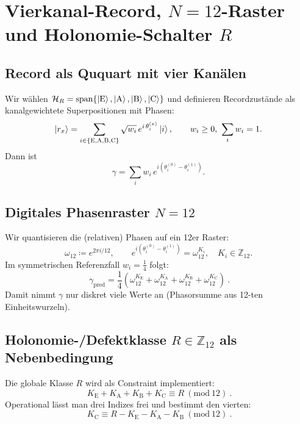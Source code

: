 \documentclass[11pt,a4paper]{article}
\newcommand{\Z}{\mathbb{Z}}
\newcommand{\modtwelve}{\ (\mathrm{mod}\ 12)}
\newcommand{\wT}{\omega_{12}}
\newcommand{\EE}{\mathrm{E}}
\newcommand{\AA}{\mathrm{A}}
\newcommand{\BB}{\mathrm{B}}
\newcommand{\CC}{\mathrm{C}}
\begin{document}
	\section{Vierkanal-Record, $N{=}12$-Raster und Holonomie-Schalter $R$}
	
	\subsection{Record als Ququart mit vier Kanälen}
	
	Wir wählen \(\mathcal{H}_R=\mathrm{span}\{\ket{\EE},\ket{\AA},\ket{\BB},\ket{\CC}\}\) und definieren
	Recordzustände als kanalgewichtete Superpositionen mit Phasen:
	\begin{equation}
		\ket{r_x}=\sum_{i\in\{\EE,\AA,\BB,\CC\}} \sqrt{w_i}\,e^{i\,\theta^{(x)}_i}\ket{i},
		\qquad w_i\ge 0,\ \sum_i w_i=1.
	\end{equation}
	Dann ist
	\begin{equation}
		\gamma=\sum_{i} w_i\,e^{i(\theta^{(0)}_i-\theta^{(1)}_i)}.
		\label{eq:gamma_general}
	\end{equation}
	
	\subsection{Digitales Phasenraster $N{=}12$}
	
	Wir quantisieren die (relativen) Phasen auf ein 12er Raster:
	\begin{equation}
		\wT \coloneqq e^{2\pi i/12},\qquad
		e^{i(\theta^{(0)}_i-\theta^{(1)}_i)}=\wT^{K_i},\quad K_i\in\Z_{12}.
	\end{equation}
	Im symmetrischen Referenzfall \(w_i=\tfrac14\) folgt:
	\begin{equation}
		\boxed{\ \gamma_{\mathrm{pred}}=\frac14\left(\wT^{K_\EE}+\wT^{K_\AA}+\wT^{K_\BB}+\wT^{K_\CC}\right)\ }.
		\label{eq:gamma_pred_sym}
	\end{equation}
	Damit nimmt \(\gamma\) nur diskret viele Werte an (Phasorsumme aus 12-ten Einheitswurzeln).
	
	\subsection{Holonomie-/Defektklasse $R\in\Z_{12}$ als Nebenbedingung}
	
	Die globale Klasse \(R\) wird als Constraint implementiert:
	\begin{equation}
		\boxed{\ K_\EE+K_\AA+K_\BB+K_\CC \equiv R \modtwelve\ }.
		\label{eq:constraint_R}
	\end{equation}
	Operational lässt man drei Indizes frei und bestimmt den vierten:
	\begin{equation}
		\boxed{\ K_\CC \equiv R - K_\EE - K_\AA - K_\BB \modtwelve\ }.
		\label{eq:KC}
	\end{equation}
	
\end{document}
